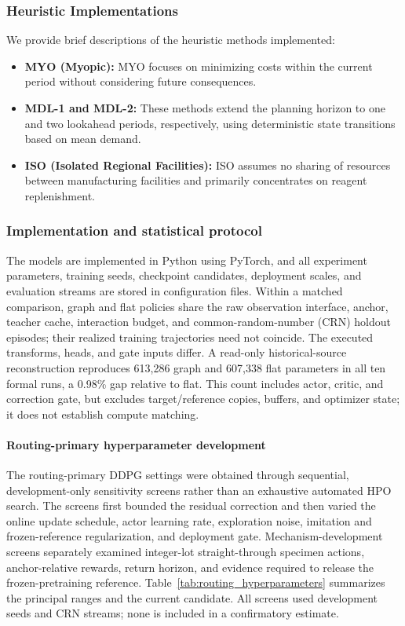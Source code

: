 \documentclass[preprint,review,12pt]{elsarticle}
\begin{document}
\subsubsection{Heuristic Implementations}
We provide brief descriptions of the heuristic methods implemented:
\begin{itemize}
    \item \textbf{MYO (Myopic):} MYO focuses on minimizing costs within the current period without considering future consequences.
    \item \textbf{MDL-1 and MDL-2:} These methods extend the planning horizon to one and two lookahead periods, respectively, using deterministic state transitions based on mean demand.
    \item \textbf{ISO (Isolated Regional Facilities):} ISO assumes no sharing of resources between manufacturing facilities and primarily concentrates on reagent replenishment.
\end{itemize}

\subsubsection{Implementation and statistical protocol}
The models are implemented in Python using PyTorch, and all experiment
parameters, training seeds, checkpoint candidates, deployment scales, and
evaluation streams are stored in configuration files. Within a matched
comparison, graph and flat policies share the raw observation interface,
anchor, teacher cache, interaction budget, and common-random-number (CRN)
holdout episodes; their realized training trajectories need not coincide.
The executed transforms, heads, and gate inputs differ. A read-only
historical-source reconstruction reproduces 613,286 graph and 607,338 flat
parameters in all ten formal runs, a 0.98\% gap relative to flat. This count
includes actor, critic, and correction gate, but excludes target/reference
copies, buffers, and optimizer state; it does not establish compute matching.

\paragraph{Routing-primary hyperparameter development}
The routing-primary DDPG settings were obtained through sequential,
development-only sensitivity screens rather than an exhaustive automated HPO
search. The screens first bounded the residual correction and then varied the
online update schedule, actor learning rate, exploration noise, imitation and
frozen-reference regularization, and deployment gate. Mechanism-development
screens separately examined integer-lot straight-through specimen actions,
anchor-relative rewards, return horizon, and evidence required to release the
frozen-pretraining reference. Table~\ref{tab:routing_hyperparameters}
summarizes the principal ranges and the current candidate. All screens used
development seeds and CRN streams; none is included in a confirmatory estimate.
\end{document}

